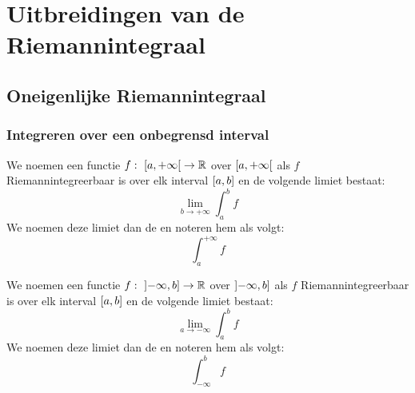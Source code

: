 \documentclass[main.tex]{subfiles}
\begin{document}
\section{Uitbreidingen van de Riemannintegraal}
\label{sec:uitbreidingen-van-de}

\subsection{Oneigenlijke Riemannintegraal}
\label{sec:oneig-riem}

\subsubsection{Integreren over een onbegrensd interval}
\label{sec:integreren-over-een}

\begin{de}
  We noemen een functie $f:\ \interval[open right]{a}{+\infty} \rightarrow \mathbb{R}$   over $\interval[open right]{a}{+\infty}$ als $f$ Riemannintegreerbaar is over elk interval $\interval{a}{b}$ en de volgende limiet bestaat:
  \[ \lim_{b\rightarrow +\infty}\int_{a}^{b}f \]
  We noemen deze limiet dan de  en noteren hem als volgt:
  \[ \int_{a}^{+\infty}f \]
\end{de}

\begin{de}
  We noemen een functie $f:\ \interval[open left]{-\infty}{b} \rightarrow \mathbb{R}$   over $\interval[open left]{-\infty}{b}$ als $f$ Riemannintegreerbaar is over elk interval $\interval{a}{b}$ en de volgende limiet bestaat:
  \[ \lim_{a\rightarrow -\infty}\int_{a}^{b}f \]
  We noemen deze limiet dan de  en noteren hem als volgt:
  \[ \int_{-\infty}^{b}f \]
\end{de}
\end{document}
